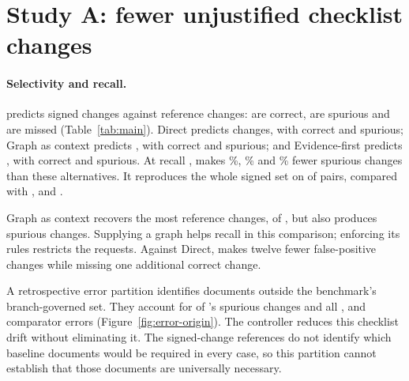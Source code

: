 \section{Study A: fewer unjustified checklist changes}
\label{sec:paired-results}

\begin{table}[t]
\centering\small
\setlength{\tabcolsep}{5pt}

\caption{Signed-change results on \nPairsHid{} held-out pairs with
\nGoldAtoms{} reference changes. Correct, spurious and missed count signed
changes; Exact counts pairs whose full signed set is reproduced. The $F_1$
interval is a 95\% family-cluster bootstrap interval. These counts describe
changes between two checklists, not requests for a complete claim.}
\label{tab:main}
\end{table}

\paragraph{Selectivity and recall.}
\casepath predicts \cpPred{} signed changes against \nGoldAtoms{}
reference changes: \cpTP{} are correct, \cpSpur{} are spurious and
\cpMiss{} are missed (Table~\ref{tab:main}). Direct predicts \dirPred{}
changes, with \dirTP{} correct and \dirSpur{} spurious; Graph as context
predicts \gcPred{}, with \gcTP{} correct and \gcSpur{} spurious; and
Evidence-first predicts \efPred{}, with \efTP{} correct and \efSpur{}
spurious. At recall \cpRec, \casepath makes \redDir\%, \redGc\% and
\redEf\% fewer spurious changes than these alternatives. It reproduces
the whole signed set on \cpExactN{} of \nPairsHid{} pairs, compared with
\dirExactN, \gcExactN{} and \efExactN.

Graph as context recovers the most reference changes, \gcTP{} of
\nGoldAtoms, but also produces \gcSpur{} spurious changes. Supplying a
graph helps recall in this comparison; enforcing its rules restricts the
requests. Against Direct, \casepath makes twelve fewer false-positive
changes while missing one additional correct change.

A retrospective error partition identifies documents outside the benchmark's
branch-governed set. They account for \eoCpOutside{} of \casepath's
\cpSpur{} spurious changes and all \eoDirOutside, \eoGcOutside{} and
\eoEfOutside{} comparator errors (Figure~\ref{fig:error-origin}). The
controller reduces this checklist drift without eliminating it. The signed-change references do not identify
which baseline documents would be required in every case, so this partition
cannot establish that those documents are universally necessary.

